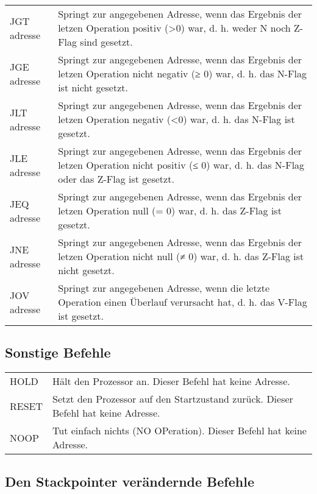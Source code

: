 \documentclass{lehramt-informatik-haupt}
\begin{document}
\begin{tabularx}{\linewidth}{lX}
JGT adresse   & Springt zur angegebenen Adresse, wenn das  Ergebnis der letzen Operation positiv (\textgreater 0) war, d. h. weder N noch  Z-Flag sind gesetzt. \\
JGE adresse   & Springt zur angegebenen Adresse, wenn das  Ergebnis der letzen Operation nicht negativ (≥ 0) war, d. h. das N-Flag  ist nicht gesetzt. \\
JLT adresse   & Springt zur angegebenen Adresse, wenn das Ergebnis der letzen Operation negativ (\textless 0) war, d. h. das N-Flag ist gesetzt. \\
JLE adresse   & Springt zur angegebenen Adresse, wenn das  Ergebnis der letzen Operation nicht positiv (≤ 0) war, d. h. das N-Flag   oder das Z-Flag ist gesetzt. \\
JEQ adresse   & Springt zur angegebenen Adresse, wenn das Ergebnis der letzen Operation null (= 0) war, d. h. das Z-Flag ist gesetzt. \\
JNE adresse   & Springt zur angegebenen Adresse, wenn das  Ergebnis der letzen Operation nicht null (≠ 0) war, d. h. das Z-Flag ist  nicht gesetzt. \\
JOV adresse   & Springt zur angegebenen Adresse, wenn die letzte Operation einen Überlauf verursacht hat, d. h. das V-Flag ist gesetzt. \\
\end{tabularx}

\subsection{Sonstige Befehle}

\begin{tabularx}{\linewidth}{lX}
HOLD          & Hält den Prozessor an. Dieser Befehl hat keine Adresse. \\
RESET         & Setzt den Prozessor auf den Startzustand zurück. Dieser Befehl hat keine Adresse. \\
NOOP          & Tut einfach nichts (NO OPeration). Dieser Befehl hat keine Adresse. \\

\end{tabularx}

\subsection{Den Stackpointer verändernde Befehle}
\end{document}
